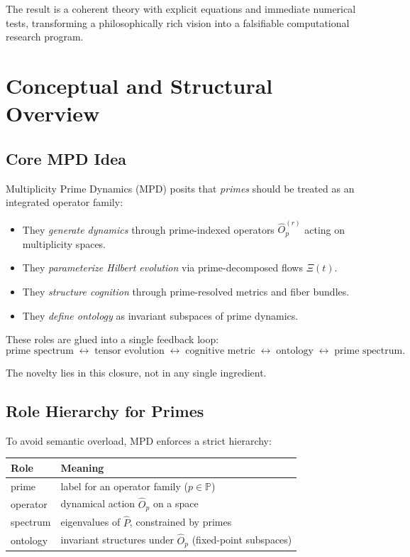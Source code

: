 \documentclass[11pt]{article}
\begin{document}
The result is a coherent theory with explicit equations and immediate numerical tests, transforming a philosophically rich vision into a falsifiable computational research program.

\section{Conceptual and Structural Overview}

\subsection{Core MPD Idea}

Multiplicity Prime Dynamics (MPD) posits that \emph{primes} should be treated as an integrated operator family:

\begin{itemize}[nosep]
  \item They \emph{generate dynamics} through prime-indexed operators $\hat{O}_p^{(r)}$ acting on multiplicity spaces.
  \item They \emph{parameterize Hilbert evolution} via prime-decomposed flows $\Xi(t)$.
  \item They \emph{structure cognition} through prime-resolved metrics and fiber bundles.
  \item They \emph{define ontology} as invariant subspaces of prime dynamics.
\end{itemize}

These roles are glued into a single feedback loop:
\[
\text{prime spectrum} \;\leftrightarrow\; \text{tensor evolution} \;\leftrightarrow\; \text{cognitive metric} \;\leftrightarrow\; \text{ontology} \;\leftrightarrow\; \text{prime spectrum}.
\]

The novelty lies in this closure, not in any single ingredient.

\subsection{Role Hierarchy for Primes}

To avoid semantic overload, MPD enforces a strict hierarchy:

\begin{center}
\begin{tabular}{ll}
\textbf{Role} & \textbf{Meaning} \\
\hline
prime & label for an operator family ($p \in \mathbb{P}$) \\
operator & dynamical action $\hat{O}_p$ on a space \\
spectrum & eigenvalues of $\hat{P}$, constrained by primes \\
ontology & invariant structures under $\hat{O}_p$ (fixed-point subspaces)
\end{tabular}
\end{center}
\end{document}
